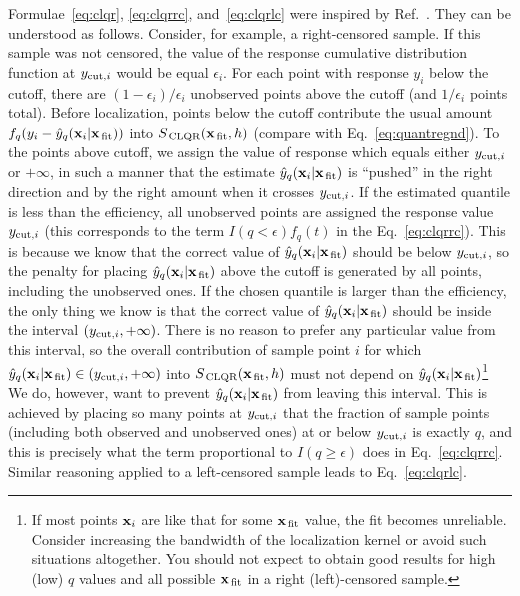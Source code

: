 \documentclass[12pt,titlepage]{article}
\newcommand{\sub}[1]{\ensuremath{_{\mbox{\scriptsize \,#1}}}}
\begin{document}
Formulae~\ref{eq:clqr}, \ref{eq:clqrrc}, and~\ref{eq:clqrlc} were inspired
by Ref.~\cite{ref:localquantreg}. They can be understood as follows. Consider, for example,
a right-censored sample. If this sample was not censored, the value of the
response  cumulative distribution function at $y_{\mbox{\scriptsize  cut},i}$
would be equal $\epsilon_i$.
For each point with response $y_i$ below the cutoff,
there are $(1 - \epsilon_i)/\epsilon_i$ unobserved points above the cutoff (and $1/\epsilon_i$ points total).
Before localization, points below
the cutoff contribute the usual amount $f_q(y_i - \hat{y}_q({\bf x}_i|{\bf x}\sub{fit}))$
into $S\sub{CLQR}({\bf x}\sub{fit}, h)$ (compare with
Eq.~\ref{eq:quantregnd}). To the points above cutoff, we assign
the value of response which  equals either
$y_{\mbox{\scriptsize  cut},i}$ or $+\infty$, in such a manner that the estimate
$\hat{y}_q({\bf x}_i|{\bf x}\sub{fit})$ is ``pushed'' in the
right direction and by the right amount when it crosses $y_{\mbox{\scriptsize  cut},i}$.
If the estimated quantile is less than the efficiency, all unobserved points
are assigned the response value $y_{\mbox{\scriptsize  cut},i}$ 
(this corresponds to the term $I(q < \epsilon) f_q(t)$ in the Eq.~\ref{eq:clqrrc}). This is
because we know that the correct value of $\hat{y}_q({\bf x}_i|{\bf x}\sub{fit})$
should be below $y_{\mbox{\scriptsize  cut},i}$, so the penalty for placing
$\hat{y}_q({\bf x}_i|{\bf x}\sub{fit})$ above the cutoff is generated
by all points, including the unobserved ones. If the chosen quantile is
larger than the efficiency, the only thing we know is that the correct value of
$\hat{y}_q({\bf x}_i|{\bf x}\sub{fit})$ should be inside the interval
$(y_{\mbox{\scriptsize  cut},i}, +\infty)$. There is no reason to prefer
any particular value from this interval, so the overall contribution of
sample point $i$ for which $\hat{y}_q({\bf x}_i|{\bf x}\sub{fit}) \in (y_{\mbox{\scriptsize cut},i}, +\infty)$
into $S\sub{CLQR}({\bf x}\sub{fit}, h)$ must not depend on 
$\hat{y}_q({\bf x}_i|{\bf x}\sub{fit})$\footnote{If most points ${\bf x}_i$
are like that for some ${\bf x}\sub{fit}$ value, the fit becomes
unreliable. Consider increasing the bandwidth of the localization
kernel or avoid such situations altogether. You should not expect
to obtain good results for high (low) $q$ values and all possible
${\bf x}\sub{fit}$ in a right (left)-censored sample.}
We do, however, want to prevent $\hat{y}_q({\bf x}_i|{\bf x}\sub{fit})$ from leaving
this interval. This is achieved by placing so many points at $y_{\mbox{\scriptsize  cut},i}$
that the fraction of sample points (including both observed and unobserved ones)
at or below $y_{\mbox{\scriptsize  cut},i}$ is exactly $q$, and this is precisely
what the term proportional to $I(q \ge \epsilon)$ does in Eq.~\ref{eq:clqrrc}.
Similar reasoning applied to a left-censored sample leads to Eq.~\ref{eq:clqrlc}.
\end{document}
